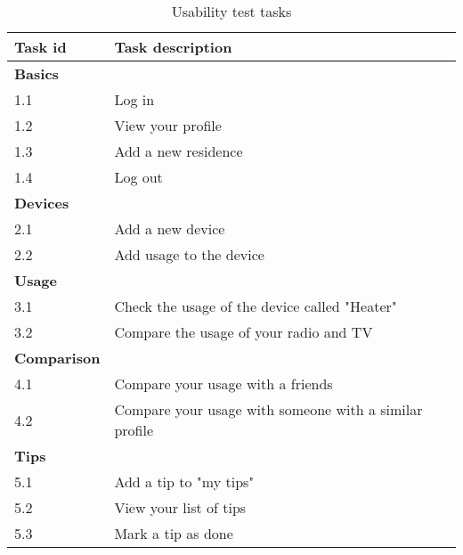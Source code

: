 \begin{table}[H]
\begin{tabular}{|l|p{10.5cm}|}
\hline
\textbf{Task id }& \textbf{Task description}\\\hline
\textbf{Basics }&\\\hline
1.1 & Log in\\\hline
1.2 & View your profile\\\hline
1.3 & Add a new residence\\\hline
1.4 & Log out\\\hline
\textbf{Devices}&\\\hline
2.1 & Add a new device\\\hline
2.2 & Add usage to the device\\\hline
\textbf{Usage}&\\\hline
3.1 & Check the usage of the device called "Heater"\\\hline
3.2 & Compare the usage of your radio and TV\\\hline
\textbf{Comparison}&\\\hline
4.1 & Compare your usage with a friends\\\hline
4.2 & Compare your usage with someone with a similar profile\\\hline
\textbf{Tips}&\\\hline
5.1 & Add a tip to "my tips"\\\hline
5.2 & View your list of tips\\\hline
5.3 & Mark a tip as done\\\hline
\end{tabular}
\caption{Usability test tasks}
\label{tab:usabilityTests}
\end{table}